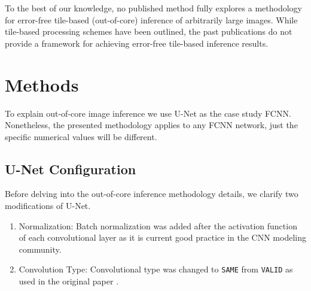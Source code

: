 \documentclass[runningheads]{llncs}
\begin{document}
To the best of our knowledge, no published method fully explores a methodology for error-free tile-based (out-of-core) inference of arbitrarily large images. While tile-based processing schemes have been outlined, the past publications do not provide a framework for achieving error-free tile-based inference results.


\section{Methods}
\label{methods}

To explain out-of-core image inference we use U-Net \cite{Ronneberger2015a} as the case study FCNN. Nonetheless, the presented methodology applies to any FCNN network, just the specific numerical values will be different. 

\subsection{U-Net Configuration}

Before delving into the out-of-core inference methodology details, we clarify two modifications of U-Net. 

\begin{enumerate}
	\item Normalization: Batch normalization \cite{ioffe2015batch} was added after the activation function of each convolutional layer as it is current good practice in the CNN modeling community. 
	\item Convolution Type: Convolutional type was changed to \texttt{SAME} from \texttt{VALID} as used in the original paper \cite{Ronneberger2015a}.
\end{enumerate}
\end{document}
